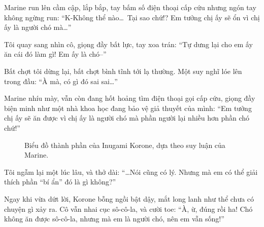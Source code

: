 \documentclass[../main.tex]{subfiles}
\begin{document}
Marine run lên cầm cập, lắp bắp, tay bấm số điện thoại cấp cứu nhưng ngón tay không ngừng run: ``K-Không thể nào\dots\ Tại sao chứ!? Em tưởng chị ấy sẽ ổn vì chị ấy là người chó mà\dots''

Tôi quay sang nhìn cô, giọng đầy bất lực, tay xoa trán: ``Tự dưng lại cho em ấy ăn cái đó làm gì! Em ấy là chó--''

Bất chợt tôi dừng lại, bất chợt bình tĩnh tới lạ thường. Một suy nghĩ lóe lên trong đầu: ``À mà, có gì đó sai sai\dots''

Marine nhíu mày, vẫn còn đang hốt hoảng tìm điện thoại gọi cấp cứu, giọng đầy biện minh như một nhà khoa học đang bảo vệ giả thuyết của mình: ``Em tưởng chị ấy sẽ ăn được vì chị ấy là người chó mà phần người lại nhiều hơn phần chó chứ!''

\begin{figure}
    \caption{Biểu đồ thành phần của Inugami Korone, dựa theo suy luận của Marine.}
\end{figure}

Tôi ngẫm lại một lúc lâu, và thở dài: ``\dots  Nói cũng có lý. Nhưng mà em có thể giải thích phần ``bí ẩn'' đó là gì không?''

Ngay khi vừa dứt lời, Korone bỗng ngồi bật dậy, mắt long lanh như thể chưa có chuyện gì xảy ra. Cô vẫn nhai cục sô-cô-la, và cười toe: ``À, ừ, đúng rồi ha! Chó không ăn được sô-cô-la, nhưng mà em là người chó, nên em vẫn sống!''
\end{document}
